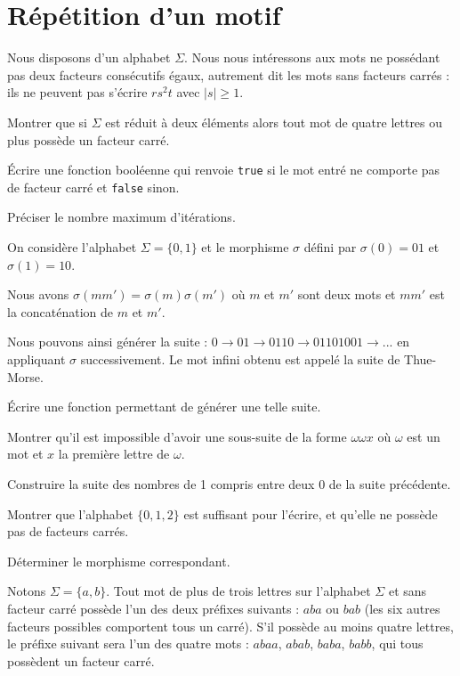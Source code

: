 \renewcommand{\SourceFile}{2-jouer-avec-les-mots/src/2-8.ml}

\section{Répétition d'un motif}

Nous disposons d'un alphabet $\Sigma$. Nous nous intéressons aux mots ne possédant pas deux facteurs consécutifs égaux, autrement dit les mots sans facteurs carrés : ils ne peuvent pas s'écrire $rs^2t$ avec $|s|\geq1$.

\Q
Montrer que si $\Sigma$ est réduit à deux éléments alors tout mot de quatre lettres ou plus possède un facteur carré.

\Q
Écrire une fonction booléenne qui renvoie \texttt{true} si le mot entré ne comporte pas de facteur carré et \texttt{false} sinon.
\smallskip

Préciser le nombre maximum d'itérations.

\Q
On considère l'alphabet $\Sigma=\{0,1\}$ et le morphisme $\sigma$ défini par $\sigma(0) = 01$ et $\sigma(1) = 10$.
\vspace{-12pt}
\smallskip

Nous avons $\sigma(mm')=\sigma(m)\sigma(m')$ où $m$ et $m'$ sont deux mots et $mm'$ est la concaténation de $m$ et $m'$.
\smallskip

Nous pouvons ainsi générer la suite : $0 \rightarrow 01 \rightarrow 0110 \rightarrow 01101001 \rightarrow ...$ en appliquant $\sigma$ successivement. Le mot infini obtenu est appelé la suite de Thue-Morse.
\medskip

Écrire une fonction permettant de générer une telle suite.
\medskip

Montrer qu'il est impossible d'avoir une sous-suite de la forme $\omega\omega x$ où $\omega$ est un mot et $x$ la première lettre de $\omega$.

\Q
Construire la suite des nombres de 1 compris entre deux 0 de la suite précédente.
\medskip

Montrer que l'alphabet $\{0,1,2\}$ est suffisant pour l'écrire, et qu'elle ne possède pas de facteurs carrés.
\medskip

Déterminer le morphisme correspondant.

\Corrige

\Q
Notons $\Sigma=\{a,b\}$. Tout mot de plus de trois lettres sur l'alphabet $\Sigma$ et sans facteur carré possède l'un des deux préfixes suivants : $aba$ ou $bab$ (les six autres facteurs possibles comportent tous un carré). S'il possède au moins quatre lettres, le préfixe suivant sera l'un des quatre mots : $abaa$, $abab$, $baba$, $babb$, qui tous possèdent un facteur carré.

